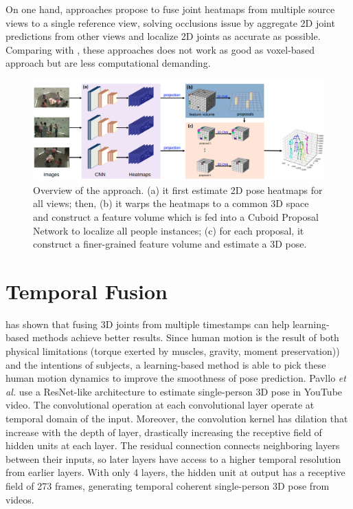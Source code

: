 On one hand, approaches \cite{multiviewpose, epipolartransformers} propose to fuse joint heatmaps from multiple source views to a single reference view, solving occlusions issue by aggregate 2D joint predictions from other views and localize 2D joints as accurate as possible. Comparing with \cite{iskakov2019learnable, voxelpose}, these approaches does not work as good as voxel-based approach but are less computational demanding.
\begin{figure}
	\centering
	\includegraphics[width=1.0\columnwidth]{figures/ch3/overview-voxelpose.png}
	\caption{Overview of the \cite{voxelpose} approach. (a) it first estimate 2D pose heatmaps for all views; then, (b) it warps the heatmaps to a common 3D space and construct a feature volume which is fed into a Cuboid Proposal Network to localize all people instances; (c) for each proposal, it construct a finer-grained feature volume and estimate a 3D pose.} 
	\label{fig:ch3-overview-voxelpose}
\end{figure}
\section{Temporal Fusion}
\cite{julieta2017motion, pavllo:videopose3d:2019} has shown that fusing 3D joints from multiple timestamps can help learning-based methods achieve better results. Since human motion is the result of both physical limitations (torque exerted by muscles, gravity,
moment preservation)) and the intentions of subjects, a learning-based method is able to pick these human motion dynamics to improve the smoothness of pose prediction. Pavllo \textit{et al.} \cite{pavllo:videopose3d:2019} use a ResNet-like architecture to estimate single-person 3D pose in YouTube video. The convolutional operation at each convolutional layer operate at temporal domain of the input. Moreover, the convolution kernel has dilation that increase with the depth of layer, drastically increasing the receptive field of hidden units at each layer. The residual connection connects neighboring layers between their inputs, so later layers have access to a higher temporal resolution from earlier layers. With only 4 layers, the hidden unit at output has a receptive field of 273 frames, generating temporal coherent single-person 3D pose from videos.

